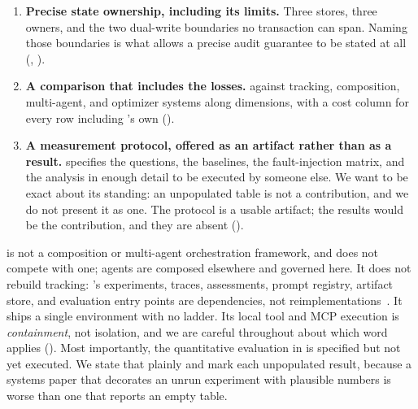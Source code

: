\begin{enumerate}
\item \textbf{Precise state ownership, including its limits.} Three stores, three
owners, and the two dual-write boundaries no transaction can span. Naming those
boundaries is what allows a precise audit guarantee to be stated at all
(, ).

\item \textbf{A comparison that includes the losses.} \sys against tracking,
composition, multi-agent, and optimizer systems along \statCompareDims{}
dimensions, with a cost column for every row including \sys's own
().

\item \textbf{A measurement protocol, offered as an artifact rather than as a
result.}  specifies the questions, the baselines, the
fault-injection matrix, and the analysis in enough detail to be executed by someone
else. We want to be exact about its standing: an unpopulated table is not a
contribution, and we do not present it as one. The protocol is a usable artifact;
the results would be the contribution, and they are absent
().
\end{enumerate}

 \sys is not a composition or multi-agent
orchestration framework, and does not compete with one; agents are composed
elsewhere and governed here. It does not rebuild tracking: \mlflow{}'s
experiments, traces, assessments, prompt registry, artifact store, and evaluation
entry points are dependencies, not
reimplementations~\cite{mlflowgenai,mlflowpromptregistry}. It ships a single environment with no
\arrowto{}\arrowto{} ladder. Its local tool and MCP
execution is \emph{containment}, not isolation, and we are careful throughout
about which word applies (). Most importantly, the
quantitative evaluation in  is specified but not yet executed.
We state that plainly and mark each unpopulated result, because a systems paper
that decorates an unrun experiment with plausible numbers is worse than one that
reports an empty table.
